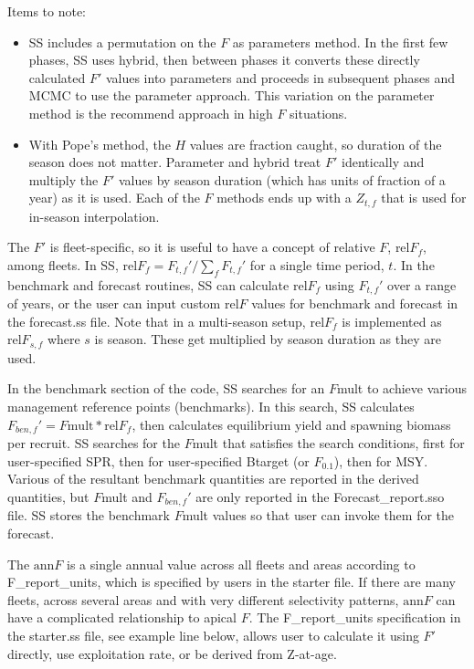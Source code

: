 Items to note:
\begin{itemize}
	\item SS includes a permutation on the $F$ as parameters method. In the first few phases, SS uses hybrid, then between phases it converts these directly calculated $F'$ values into parameters and proceeds in subsequent phases and MCMC to use the parameter approach. This variation on the parameter method is the recommend approach in high $F$ situations.
	
	\item With Pope’s method, the $H$ values are fraction caught, so duration of the season does not matter. Parameter and hybrid treat $F'$ identically and multiply the $F'$ values by season duration (which has units of fraction of a year) as it is used. Each of the $F$ methods ends up with a $Z_{t,f}$ that is used for in-season interpolation.
\end{itemize}

The $F'$ is fleet-specific, so it is useful to have a concept of relative $F$, $\text{rel}F_f$, among fleets.  In SS, $\text{rel}F_f= F_{t,f}'/\sum_{f}^{}F_{t,f}'$ for a single time period, $t$. In the benchmark and forecast routines, SS can calculate $\text{rel}F_f$ using $F_{t,f}'$ over a range of years, or the user can input custom $\text{rel}F$ values for benchmark and forecast in the forecast.ss file. Note that in a multi-season setup, $\text{rel}F_f$ is implemented as $\text{rel}F_{s,f}$ where $s$ is season.  These get multiplied by season duration as they are used.

In the benchmark section of the code, SS searches for an $F$mult to achieve various management reference points (benchmarks).  In this search, SS calculates $F_{ben,f}' = F\text{mult} * \text{rel}F_f$, then calculates equilibrium yield and spawning biomass per recruit. SS searches for the $F$mult that satisfies the search conditions, first for user-specified SPR, then for user-specified Btarget (or $F_{0.1}$), then for MSY.  Various of the resultant benchmark quantities are reported in the derived quantities, but $F$mult and $F_{ben,f}'$ are only reported in the Forecast\_report.sso file.  SS stores the benchmark $F$mult values so that user can invoke them for the forecast.

The $\text{ann}F$ is a single annual value across all fleets and areas according to F\_report\_units, which is specified by users in the starter file.  If there are many fleets, across several areas and with very different selectivity patterns, $\text{ann}F$ can have a complicated relationship to apical $F$.  The F\_report\_units specification in the starter.ss file, see example line below, allows user to calculate it using $F'$ directly, use exploitation rate, or be derived from Z-at-age.

